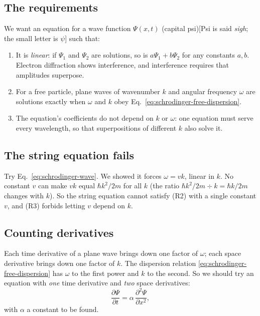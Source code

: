 \subsection{The requirements}

We want an equation for a wave function $\Psi(x,t)$ (capital psi)[Psi is said \emph{sigh}; the small letter is $\psi$] such that:
\begin{enumerate}
\item[(R1)] It is \emph{linear}: if $\Psi_1$ and $\Psi_2$ are solutions, so is $a\Psi_1+b\Psi_2$ for any constants $a,b$. Electron diffraction shows interference, and interference requires that amplitudes superpose.
\item[(R2)] For a free particle, plane waves of wavenumber $k$ and angular frequency $\omega$ are solutions exactly when $\omega$ and $k$ obey Eq.~\eqref{eq:schrodinger-free-dispersion}.
\item[(R3)] The equation's coefficients do not depend on $k$ or $\omega$: one equation must serve every wavelength, so that superpositions of different $k$ also solve it.
\end{enumerate}

\subsection{The string equation fails}

Try Eq.~\eqref{eq:schrodinger-wave}. We showed it forces $\omega=vk$, linear in $k$. No constant $v$ can make $vk$ equal $\hbar k^2/2m$ for all $k$ (the ratio $\hbar k^2/2m\div k=\hbar k/2m$ changes with $k$). So the string equation cannot satisfy (R2) with a single constant $v$, and (R3) forbids letting $v$ depend on $k$.

\subsection{Counting derivatives}

Each time derivative of a plane wave brings down one factor of $\omega$; each space derivative brings down one factor of $k$. The dispersion relation \eqref{eq:schrodinger-free-dispersion} has $\omega$ to the first power and $k$ to the second. So we should try an equation with \emph{one} time derivative and \emph{two} space derivatives:
\begin{equation}
\frac{\partial\Psi}{\partial t}=\alpha\,\frac{\partial^2\Psi}{\partial x^2},
\label{eq:schrodinger-trial}
\end{equation}
with $\alpha$ a constant to be found.

